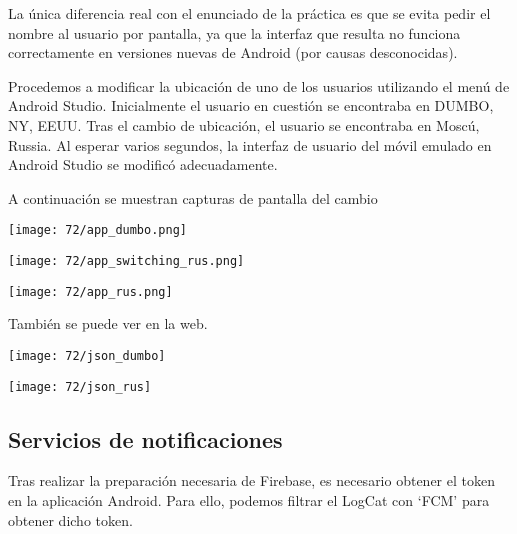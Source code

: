 La única diferencia real con el enunciado de la práctica es que se evita pedir el nombre
al usuario por pantalla, ya que la interfaz que resulta no funciona correctamente en versiones
nuevas de Android (por causas desconocidas).

Procedemos a modificar la ubicación de uno de los usuarios utilizando el menú de Android Studio.
Inicialmente el usuario en cuestión se encontraba en DUMBO, NY, EEUU.
Tras el cambio de ubicación, el usuario se encontraba en Moscú, Russia.
Al esperar varios segundos, la interfaz de usuario del móvil emulado en Android Studio se modificó adecuadamente.

A continuación se muestran capturas de pantalla del cambio

\begin{minipage}{\linewidth}
	\centering
	\texttt{[image: 72/app\_dumbo.png]}
	\label{fig:7/6}
\end{minipage}
\begin{minipage}{\linewidth}
	\centering
	\texttt{[image: 72/app\_switching\_rus.png]}
	\label{fig:7/7}
\end{minipage}
\begin{minipage}{\linewidth}
	\centering
	\texttt{[image: 72/app\_rus.png]}
	\label{fig:7/8}
\end{minipage}

También se puede ver en la web.

\begin{minipage}{\linewidth}
	\centering
	\texttt{[image: 72/json\_dumbo]}
	\label{fig:7/9}
\end{minipage}
\begin{minipage}{\linewidth}
	\centering
	\texttt{[image: 72/json\_rus]}
	\label{fig:7/10}
\end{minipage}

\subsection{Servicios de notificaciones}

Tras realizar la preparación necesaria de Firebase, es necesario obtener el token en la aplicación Android.
Para ello, podemos filtrar el LogCat con `FCM' para obtener dicho token.

